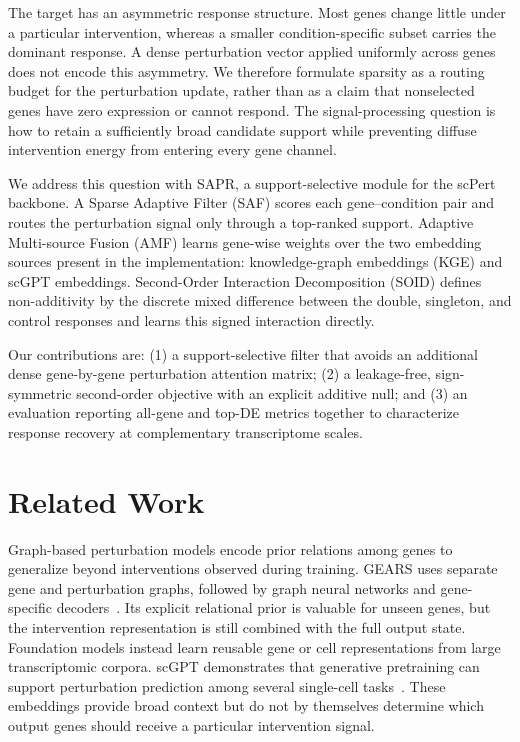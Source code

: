 \documentclass[conference]{IEEEtran}
\newcommand{\method}{SAPR}
\newcommand{\saf}{SAF}
\newcommand{\amf}{AMF}
\newcommand{\soid}{SOID}
\begin{document}
The target has an asymmetric response structure. Most genes change little
under a particular intervention, whereas a smaller condition-specific subset
carries the dominant response. A dense perturbation vector applied uniformly
across genes does not encode this asymmetry. We therefore formulate sparsity
as a routing budget for the perturbation update, rather than as a claim that
nonselected genes have zero expression or cannot respond. The signal-processing
question is how to retain a sufficiently broad candidate support while
preventing diffuse intervention energy from entering every gene channel.

We address this question with \method{}, a support-selective module for the
scPert backbone. A Sparse Adaptive Filter (\saf) scores each gene--condition
pair and routes the perturbation signal only through a top-ranked support.
Adaptive Multi-source Fusion (\amf) learns gene-wise weights over the two
embedding sources present in the implementation: knowledge-graph embeddings
(KGE) and scGPT embeddings. Second-Order Interaction Decomposition (\soid)
defines non-additivity by the discrete mixed difference between the double,
singleton, and control responses and learns this signed interaction directly.

Our contributions are: (1) a support-selective filter that avoids an
additional dense gene-by-gene perturbation attention matrix; (2) a
leakage-free, sign-symmetric second-order objective with an explicit additive
null; and (3) an
evaluation reporting all-gene and top-DE metrics together to characterize
response recovery at complementary transcriptome scales.

\section{Related Work}
Graph-based perturbation models encode prior relations among genes to
generalize beyond interventions observed during training. GEARS uses separate
gene and perturbation graphs, followed by graph neural networks and
gene-specific decoders~\cite{gears}. Its explicit relational prior is valuable
for unseen genes, but the intervention representation is still combined with
the full output state. Foundation models instead learn reusable gene or cell
representations from large transcriptomic corpora. scGPT demonstrates that
generative pretraining can support perturbation prediction among several
single-cell tasks~\cite{scgpt}. These embeddings provide broad context but do
not by themselves determine which output genes should receive a particular
intervention signal.
\end{document}
